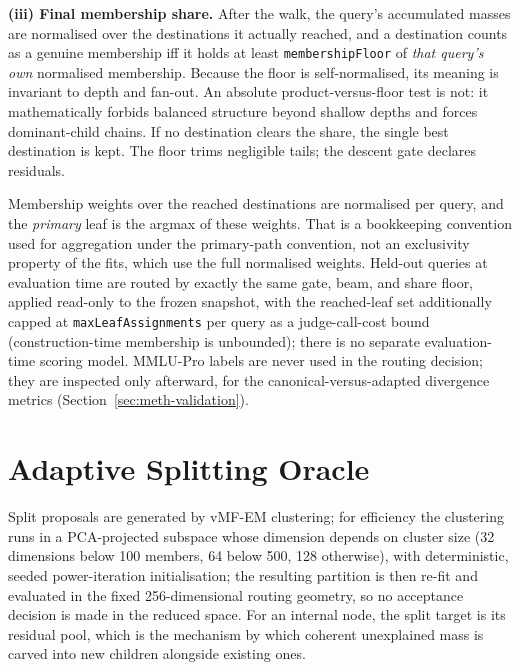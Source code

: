 \textbf{(iii) Final membership share.}
After the walk, the query's accumulated masses are normalised over
the destinations it actually reached, and a destination counts as a
genuine membership iff it holds at least
\texttt{membershipFloor} of \emph{that query's own} normalised
membership.
Because the floor is self-normalised, its meaning is invariant to
depth and fan-out. An absolute product-versus-floor test is not: it
mathematically forbids balanced structure beyond shallow depths and
forces dominant-child chains.
If no destination clears the share, the single best destination is
kept. The floor trims negligible tails; the descent gate declares
residuals.

Membership weights over the reached destinations are normalised per
query, and the \textit{primary} leaf is the argmax of these
weights. That is a bookkeeping convention used for aggregation under
the primary-path convention, not an exclusivity property of the fits,
which use the full normalised weights.
Held-out queries at evaluation time are routed by exactly the same
gate, beam, and share floor, applied read-only to the frozen
snapshot, with the reached-leaf set additionally capped at
\texttt{maxLeafAssignments} per query as a judge-call-cost bound
(construction-time membership is unbounded); there is no separate
evaluation-time scoring model.
MMLU-Pro labels are never used in the routing decision; they
are inspected only afterward, for the canonical-versus-adapted
divergence metrics (Section~\ref{sec:meth-validation}).

\section{Adaptive Splitting Oracle}\label{sec:meth-split}

Split proposals are generated by vMF-EM clustering; for efficiency
the clustering runs in a PCA-projected subspace whose dimension
depends on cluster size (32 dimensions below 100 members, 64 below
500, 128 otherwise), with deterministic, seeded power-iteration
initialisation; the resulting partition is then re-fit and evaluated
in the fixed 256-dimensional routing geometry, so no acceptance
decision is made in the reduced space.
For an internal node, the split target is its residual pool, which is
the mechanism by which coherent unexplained mass is carved into new
children alongside existing ones.

